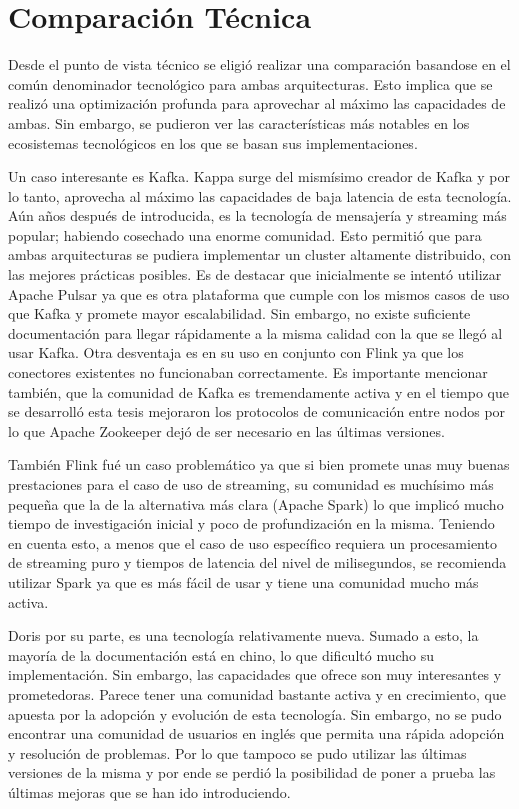 \section{Comparación Técnica}

Desde el punto de vista técnico se eligió realizar una comparación basandose en el común denominador tecnológico para ambas arquitecturas.
Esto implica que se realizó una optimización profunda para aprovechar al máximo las capacidades de ambas. 
Sin embargo, se pudieron ver las características más notables en los ecosistemas tecnológicos en los que se basan sus implementaciones. 

Un caso interesante es Kafka. Kappa surge del mismísimo creador de Kafka y por lo tanto, aprovecha al máximo las capacidades de baja latencia de esta tecnología.
Aún años después de introducida, es la tecnología de mensajería y streaming más popular; habiendo cosechado una enorme comunidad. 
Esto permitió que para ambas arquitecturas se pudiera implementar un cluster altamente distribuido, con las mejores prácticas posibles. 
Es de destacar que inicialmente se intentó utilizar Apache Pulsar ya que es otra plataforma que cumple con los mismos casos de uso que Kafka y promete mayor escalabilidad. 
Sin embargo, no existe suficiente documentación para llegar rápidamente a la misma calidad con la que se llegó al usar Kafka. 
Otra desventaja es en su uso en conjunto con Flink ya que los conectores existentes no funcionaban correctamente. 
Es importante mencionar también, que la comunidad de Kafka es tremendamente activa 
y en el tiempo que se desarrolló esta tesis mejoraron los protocolos de comunicación entre nodos por lo que Apache Zookeeper dejó de ser necesario en las últimas versiones.

También Flink fué un caso problemático ya que si bien promete unas muy buenas prestaciones para el caso de uso de streaming, 
su comunidad es muchísimo más pequeña que la de la alternativa más clara (Apache Spark) lo que implicó mucho tiempo de investigación inicial y poco de profundización en la misma. 
Teniendo en cuenta esto, a menos que el caso de uso específico requiera un procesamiento de streaming puro y tiempos de latencia del nivel de milisegundos,
se recomienda utilizar Spark ya que es más fácil de usar y tiene una comunidad mucho más activa.

Doris por su parte, es una tecnología relativamente nueva. Sumado a esto, la mayoría de la documentación está en chino, lo que dificultó mucho su implementación.
Sin embargo, las capacidades que ofrece son muy interesantes y prometedoras. Parece tener una comunidad bastante activa y en crecimiento, 
que apuesta por la adopción y evolución de esta tecnología. 
Sin embargo, no se pudo encontrar una comunidad de usuarios en inglés que permita una rápida adopción y resolución de problemas. Por lo que tampoco se pudo utilizar 
las últimas versiones de la misma y por ende se perdió la posibilidad de poner a prueba las últimas mejoras que se han ido introduciendo.

